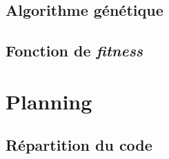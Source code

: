 \subsection{Algorithme génétique}
%
%
%
%

\subsection{Fonction de \textit{fitness} }

\section{Planning}
\subsection{Répartition du code}

